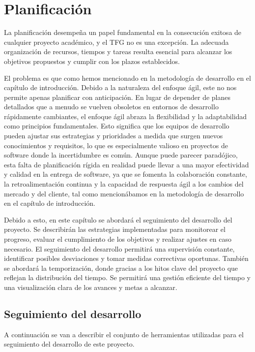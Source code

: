 \chapter{Planificación}

La planificación desempeña un papel fundamental en la consecución exitosa de cualquier proyecto académico, y el TFG no es una excepción. La adecuada organización de recursos, tiempos y tareas resulta esencial para alcanzar los objetivos propuestos y cumplir con los plazos establecidos.

El problema es que como hemos mencionado en la metodología de desarrollo en el capítulo de introducción. Debido a la naturaleza del enfoque ágil, este no nos permite apenas planificar con anticipación. En lugar de depender de planes detallados que a menudo se vuelven obsoletos en entornos de desarrollo rápidamente cambiantes, el enfoque ágil abraza la flexibilidad y la adaptabilidad como principios fundamentales. Esto significa que los equipos de desarrollo pueden ajustar sus estrategias y prioridades a medida que surgen nuevos conocimientos y requisitos, lo que es especialmente valioso en proyectos de software donde la incertidumbre es común. Aunque puede parecer paradójico, esta falta de planificación rígida en realidad puede llevar a una mayor efectividad y calidad en la entrega de software, ya que se fomenta la colaboración constante, la retroalimentación continua y la capacidad de respuesta ágil a los cambios del mercado y del cliente, tal como mencionábamos en la metodología de desarrollo en el capítulo de introducción.

Debido a esto, en este capítulo se abordará el seguimiento del desarrollo del proyecto. Se describirán las estrategias implementadas para monitorear el progreso, evaluar el cumplimiento de los objetivos y realizar ajustes en caso necesario. El seguimiento del desarrollo permitirá una supervisión constante, identificar posibles desviaciones y tomar medidas correctivas oportunas. También se abordará la temporización, donde gracias a los hitos clave del proyecto que reflejan la distribución del tiempo. Se permitirá una gestión eficiente del tiempo y una visualización clara de los avances y metas a alcanzar.

\section{Seguimiento del desarrollo}

A continuación se van a describir el conjunto de herramientas utilizadas para el seguimiento del desarrollo de este proyecto.


